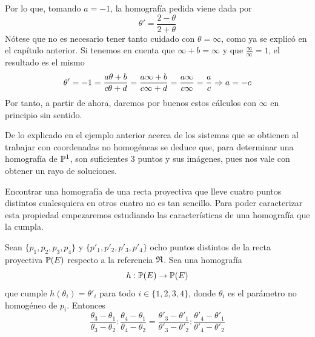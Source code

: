 \begin{exa}
	Por lo que, tomando $a=-1$, la homografía pedida viene dada por
	\begin{equation*}
		\theta'=\frac{2-\theta}{2+\theta}
	\end{equation*}
	Nótese que no es necesario tener tanto cuidado con $\theta=\infty$, como ya se explicó en el capítulo anterior. Si tenemos en cuenta que $\infty+b=\infty$ y que $\frac{\infty}{\infty}=1$, el resultado es el mismo
	\begin{equation*}
		\theta'=-1=\frac{a\theta+b}{c\theta +d}=\frac{a\infty+b}{c\infty +d}=\frac{a\infty}{c\infty}=\frac{a}{c}\Rightarrow a=-c
	\end{equation*}
	Por tanto, a partir de ahora, daremos por buenos estos cálculos con $\infty$ en principio sin sentido.
\end{exa}
\begin{obs}
	De lo explicado en el ejemplo anterior acerca de los sistemas que se obtienen al trabajar con coordenadas no homogéneas se deduce que, para determinar una homografía de $\mathbb{P}^1$, son suficientes $3$ puntos y sus imágenes, pues nos vale con obtener un rayo de soluciones.
\end{obs}
Encontrar una homografía de una recta proyectiva que lleve cuatro puntos distintos cualesquiera en otros cuatro no es tan sencillo. Para poder caracterizar esta propiedad empezaremos estudiando las características de una homografía que la cumpla.
\begin{lem}
	Sean $\{p_1,p_2,p_3,p_4\}$ y $\{p'_1,p'_2,p'_3,p'_4\}$ ocho puntos distintos de la recta proyectiva $\mathbb{P}(E)$ respecto a la referencia $\mathfrak{R}$. Sea una homografía
	\[h:\mathbb{P}(E)\rightarrow \mathbb{P}(E)\]
	que cumple $h(\theta_i)=\theta'_i$ para todo $i\in\{1,2,3,4\}$, donde $\theta_i$ es el parámetro no homogéneo de $p_i$. Entonces
	\begin{equation}
		\frac{\theta_3-\theta_1}{\theta_3-\theta_2}:\frac{\theta_4-\theta_1}{\theta_4-\theta_2}=\frac{\theta'_3-\theta'_1}{\theta'_3-\theta'_2}:\frac{\theta'_4-\theta'_1}{\theta'_4-\theta'_2}
	\end{equation}
\end{lem}
